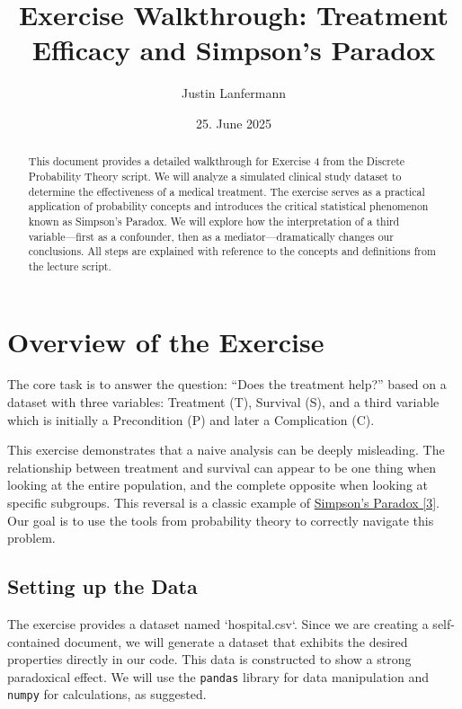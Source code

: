 \documentclass[11pt,a4paper]{article}
\title{Exercise Walkthrough: Treatment Efficacy and Simpson's Paradox}
\author{Justin Lanfermann}
\date{25. June 2025}
\begin{document}
\maketitle

\begin{abstract}
    This document provides a detailed walkthrough for Exercise 4 from the Discrete Probability Theory script. We will analyze a simulated clinical study dataset to determine the effectiveness of a medical treatment. The exercise serves as a practical application of probability concepts and introduces the critical statistical phenomenon known as Simpson's Paradox. We will explore how the interpretation of a third variable—first as a confounder, then as a mediator—dramatically changes our conclusions. All steps are explained with reference to the concepts and definitions from the lecture script.
\end{abstract}

\tableofcontents

\newpage

\section{Overview of the Exercise}
The core task is to answer the question: ``Does the treatment help?'' based on a dataset with three variables: Treatment (T), Survival (S), and a third variable which is initially a Precondition (P) and later a Complication (C).

This exercise demonstrates that a naive analysis can be deeply misleading. The relationship between treatment and survival can appear to be one thing when looking at the entire population, and the complete opposite when looking at specific subgroups. This reversal is a classic example of \hyperref[sec:simpson_paradox]{Simpson's Paradox [3]}. Our goal is to use the tools from probability theory to correctly navigate this problem.

\subsection{Setting up the Data}
The exercise provides a dataset named `hospital.csv`. Since we are creating a self-contained document, we will generate a dataset that exhibits the desired properties directly in our code. This data is constructed to show a strong paradoxical effect. We will use the \texttt{pandas} library for data manipulation and \texttt{numpy} for calculations, as suggested.
\end{document}
